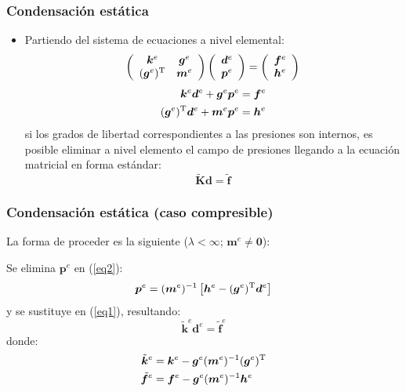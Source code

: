 \documentclass[handout]{beamer}
\begin{document}
\begin{frame}
\frametitle{Condensación estática}
\begin{itemize}
\item Partiendo del sistema de ecuaciones a nivel elemental:
$$
\left(
\begin{array}{cc}
\bm{k}^{e}&\bm{g}^{e} \\
(\bm{g}^{e})^{\rm T}&\bm{m}^{e}
\end{array}
\right)
\left(
\begin{array}{c}
\bm{d}^{e}\\
\bm{p}^{e}
\end{array}
\right) =
\left(
\begin{array}{c}
\bm{f}^{e}\\
\bm{h}^{e}
\end{array}
\right)
$$
\begin{align}
\bm{k}^{e}\bm{d}^{e}+\bm{g}^{e}\bm{p}^{e}&=\bm{f}^{e} \label{eq1} \\
(\bm{g}^{e})^{\rm T}\bm{d}^{e}+\bm{m}^{e}\bm{p}^{e}&=\bm{h}^{e} \label{eq2}
\end{align}
si los grados de libertad correspondientes a las presiones son internos,
es posible eliminar a nivel elemento el campo de presiones llegando
a la ecuación matricial en forma estándar:
\begin{equation}
\widetilde{\bm{K}} \bm{d}=\widetilde{\bm{f}}
\end{equation}
\end{itemize}
\end{frame}
\begin{frame}
\frametitle{Condensación estática (caso compresible)}

La forma de proceder es la siguiente
($\lambda <\infty$; $\bm{m}^{e} \neq\bm{0}$):

Se elimina $\bm{p}^{e}$ en (\ref{eq2}):
\begin{equation*}
\bm{p}^{e}=(\bm{m}^{e})^{-1} \left[ \bm{h}^{e}-(\bm{g}^{e})^{\rm T}\bm{d}^{e}\right]
\end{equation*}
y se sustituye en (\ref{eq1}), resultando:
\begin{equation*}
\tilde{\bm{k}}^{e} \bm{d}^{e}=\tilde{\bm{f}}^{e}
\end{equation*}
donde:
\begin{align*}
\tilde{\bm{k}}^{e}&= \bm{k}^{e}-\bm{g}^{e} (\bm{m}^{e})^{-1} (\bm{g}^{e})^{\rm T}\\
\tilde{\bm{f}}^{e}&=\bm{f}^{e}-\bm{g}^{e} (\bm{m}^{e})^{-1} \bm{h}^{e}
\end{align*}
\end{frame}
\end{document}
